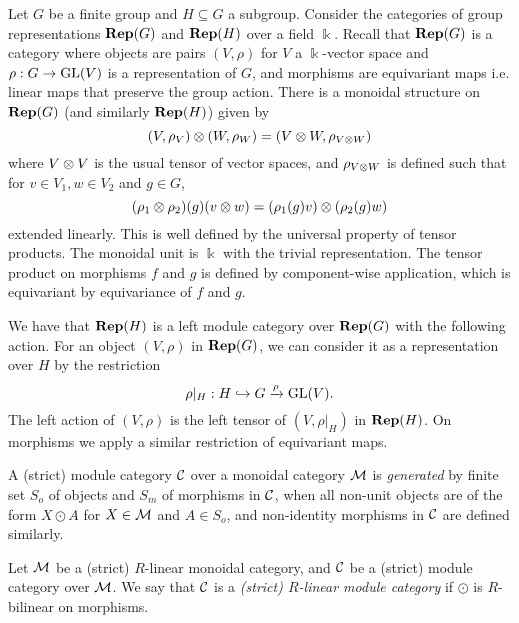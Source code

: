\begin{example}
    Let $G$ be a finite group and $H \subseteq G$ a subgroup. Consider the categories of group representations $\operatorname{\mathbf{Rep}}(G)$ and $\operatorname{\mathbf{Rep}}(H)$ over a field $\Bbbk$. Recall that $\operatorname{\mathbf{Rep}}(G)$ is a category where objects are pairs $(V, \rho)$ for $V$ a $\Bbbk$-vector space and $\rho: G \to \operatorname{GL}(V)$ is a representation of $G$, and morphisms are equivariant maps i.e. linear maps that preserve the group action. There is a monoidal structure on $\operatorname{\mathbf{Rep}}(G)$ (and similarly $\operatorname{\mathbf{Rep}}(H)$) given by
    \[
        (V, \rho_V) \otimes (W, \rho_W) = (V \otimes W, \rho_{V \otimes W})
    \]
    where $V \otimes V$ is the usual tensor of vector spaces, and $\rho_{V \otimes W}$ is defined such that for $v \in V_1, w \in V_2$ and $g \in G$,
    \[
        (\rho_1 \otimes \rho_2)(g)(v \otimes w) = (\rho_1(g) v) \otimes (\rho_2(g) w)
    \]
    extended linearly. This is well defined by the universal property of tensor products. The monoidal unit is $\Bbbk$ with the trivial representation. The tensor product on morphisms $f$ and $g$ is defined by component-wise application, which is equivariant by equivariance of $f$ and $g$.

    We have that $\operatorname{\mathbf{Rep}}(H)$ is a left module category over $\operatorname{\mathbf{Rep}}(G)$ with the following action. For an object $(V,\rho)$ in $\operatorname{\mathbf{Rep}}(G)$, we can consider it as a representation over $H$ by the restriction
    \[
        \rho|_H: H \hookrightarrow G \xrightarrow{\rho} \operatorname{GL}(V).
    \]
    The left action of $(V, \rho)$ is the left tensor of $(V,\rho|_H)$ in $\operatorname{\mathbf{Rep}}(H)$. On morphisms we apply a similar restriction of equivariant maps.
\end{example}

\begin{definition}
    A (strict) module category $\mathcal{C}$ over a monoidal category $\mathcal{M}$ is \textit{generated} by finite set $S_o$ of objects and $S_m$ of morphisms in $\mathcal{C}$, when all non-unit objects are of the form $X \odot A$ for $X \in \mathcal{M}$ and $A \in S_o$, and non-identity morphisms in $\mathcal{C}$ are defined similarly.
\end{definition}

\begin{definition}
    Let $\mathcal{M}$ be a (strict) $R$-linear monoidal category, and $\mathcal{C}$ be a (strict) module category over $\mathcal{M}$. We say that $\mathcal{C}$ is a \textit{(strict) $R$-linear module category} if $\odot$ is $R$-bilinear on morphisms.
\end{definition}

